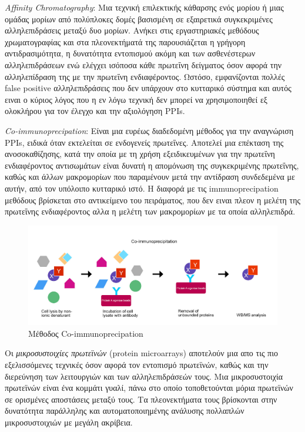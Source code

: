 \textit{Affinity Chromatography}: Μια τεχνική επιλεκτικής κάθαρσης ενός μορίου ή μιας ομάδας μορίων από πολύπλοκες δομές βασισμένη σε εξαιρετικά συγκεκριμένες αλληλεπιδράσεις μεταξύ δυο μορίων\cite{Urh2009}. Ανήκει στις εργαστηριακές μεθόδους χρωματογραφίας και στα πλεονεκτήματά της παρουσιάζεται η γρήγορη αντιδρασιμότητα, η δυνατότητα εντοπισμού ακόμη και των ασθενέστερων αλληλεπιδράσεων ενώ ελέγχει ισόποσα κάθε πρωτεΐνη δείγματος όσον αφορά την αλληλεπίδραση της με την πρωτεΐνη ενδιαφέροντος. Ωστόσο, εμφανίζονται πολλές false positive αλληλεπιδράσεις που δεν υπάρχουν στο κυτταρικό σύστημα και αυτός ειναι ο κύριος λόγος που η εν λόγω τεχνική δεν μπορεί να χρησιμοποιηθεί εξ ολοκλήρου για τον έλεγχο και την αξιολόγηση PPIs. 

\textit{Co-immunoprecipation}: Είναι μια ευρέως διαδεδομένη μέθοδος για την αναγνώριση PPIs, ειδικά όταν εκτελείται σε ενδογενείς πρωτεΐνες. Αποτελεί μια επέκταση της ανοσοκαθίζησης, κατά την οποία με τη χρήση εξειδικευμένων για την πρωτεΐνη ενδιαφέροντος αντισωμάτων είναι δυνατή η απομόνωση της συγκεκριμένης πρωτεΐνης, καθώς και άλλων μακρομορίων που παραμένουν μετά την αντίδραση συνδεδεμένα με αυτήν, από τον υπόλοιπο κυτταρικό ιστό\cite{Golemis2002}. Η διαφορά με τις immunoprecipation μεθόδους βρίσκεται στο αντικείμενο του πειράματος, που δεν ειναι πλεον η μελέτη της πρωτεΐνης ενδιαφέροντος αλλα η μελέτη των μακρομορίων με τα οποία αλληλεπιδρά.

\begin{figure}[h]
  \centering
  \includegraphics[scale=0.22]{images/Coip.jpg}
  \caption{Μέθοδος Co-immunoprecipation}
  \label{fig:coip}
\end{figure}

Οι \textit{μικροσυστοιχίες πρωτεϊνών} (protein microarrays) αποτελούν μια απο τις πιο εξελισσόμενες τεχνικές όσον αφορά τον εντοπισμό πρωτεϊνών, καθώς και την διερεύνηση των λειτουργιών και των αλληλεπιδράσεών τους. Μια μικροσυστοιχία πρωτεϊνών είναι ένα κομμάτι γυαλί, πάνω στο οποίο τοποθετούνται μόρια πρωτεϊνών σε ορισμένες αποστάσεις μεταξύ τους\cite{MacBeath2000}. Τα πλεονεκτήματα τους βρίσκονται στην δυνατότητα παράλληλης και αυτοματοποιημένης ανάλυσης πολλαπλών μικροσυστοιχιών με μεγάλη ακρίβεια.


